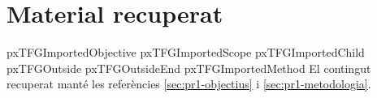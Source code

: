 \documentclass[TFG,PR,CAT]{P3CTeX}
\begin{document}
\section{Material recuperat}
\ifcsname pxTFGImportedObjective\endcsname\else{}\fi
\ifcsname pxTFGImportedScope\endcsname\else{}\fi
\ifcsname pxTFGImportedChild\endcsname\else{}\fi
\ifcsname pxTFGOutside\endcsname{}\fi
\ifcsname pxTFGOutsideEnd\endcsname{}\fi
{}
\ifcsname pxTFGImportedMethod\endcsname\else{}\fi
El contingut recuperat manté les referències \ref{sec:pr1-objectius}
i \ref{sec:pr1-metodologia}.
\end{document}
